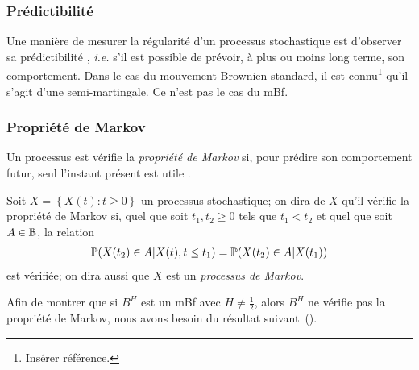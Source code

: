 \subsubsection{Prédictibilité}
\label{subsubsec:fBm-predictability}

Une manière de mesurer la régularité d'un processus stochastique est
d'observer sa \og prédictibilité \fg{}, \emph{i.e.} s'il est possible
de prévoir, à plus ou moins long terme, son comportement. Dans le cas
du mouvement Brownien standard, il est connu\footnote{Insérer
  référence.} qu'il s'agit d'une semi-martingale. Ce n'est pas le cas
du mBf.

\subsubsection{Propriété de Markov}
\label{subsubsec:fBm-markov}

Un processus est vérifie la \emph{propriété de Markov} si, pour
prédire son comportement futur, seul l'instant présent est \og utile
\fg.

\begin{definition}
  Soit $X = \left\{X(t) : t\geq 0\right\}$ un processus stochastique;
  on dira de $X$ qu'il vérifie la propriété de Markov si, quel que
  soit $t_1,t_2\geq 0$ tels que $t_1<t_2$ et quel que soit $A\in\B$,
  la relation
  \begin{align}
    \P(X(t_2) \in A| X(t), t\leq t_1) = \P(X(t_2) \in A|X(t_1))
  \end{align}
  est vérifiée; on dira aussi que $X$ est un \emph{processus de
    Markov}.
\end{definition}

Afin de montrer que si $B^H$ est un mBf avec $H\neq\frac{1}{2}$, alors
$B^H$ ne vérifie pas la propriété de Markov, nous avons besoin du
résultat suivant~(\cite{basu2007}).

